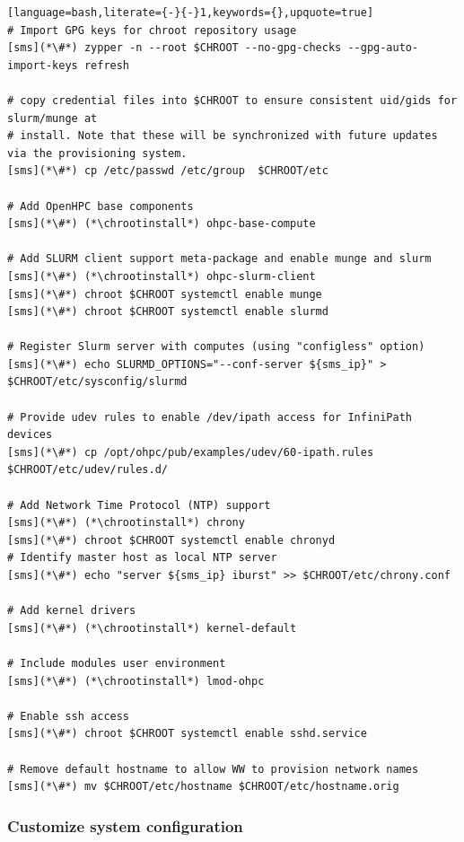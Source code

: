 \documentclass[letterpaper]{article}
\newcommand{\chrootinstall}{zypper -n --root \$CHROOT install}
\begin{document}
\begin{lstlisting}[language=bash,literate={-}{-}1,keywords={},upquote=true]
# Import GPG keys for chroot repository usage
[sms](*\#*) zypper -n --root $CHROOT --no-gpg-checks --gpg-auto-import-keys refresh

# copy credential files into $CHROOT to ensure consistent uid/gids for slurm/munge at
# install. Note that these will be synchronized with future updates via the provisioning system.
[sms](*\#*) cp /etc/passwd /etc/group  $CHROOT/etc

# Add OpenHPC base components
[sms](*\#*) (*\chrootinstall*) ohpc-base-compute

# Add SLURM client support meta-package and enable munge and slurm
[sms](*\#*) (*\chrootinstall*) ohpc-slurm-client
[sms](*\#*) chroot $CHROOT systemctl enable munge
[sms](*\#*) chroot $CHROOT systemctl enable slurmd

# Register Slurm server with computes (using "configless" option)
[sms](*\#*) echo SLURMD_OPTIONS="--conf-server ${sms_ip}" > $CHROOT/etc/sysconfig/slurmd

# Provide udev rules to enable /dev/ipath access for InfiniPath devices
[sms](*\#*) cp /opt/ohpc/pub/examples/udev/60-ipath.rules $CHROOT/etc/udev/rules.d/

# Add Network Time Protocol (NTP) support
[sms](*\#*) (*\chrootinstall*) chrony
[sms](*\#*) chroot $CHROOT systemctl enable chronyd
# Identify master host as local NTP server
[sms](*\#*) echo "server ${sms_ip} iburst" >> $CHROOT/etc/chrony.conf

# Add kernel drivers
[sms](*\#*) (*\chrootinstall*) kernel-default

# Include modules user environment
[sms](*\#*) (*\chrootinstall*) lmod-ohpc

# Enable ssh access 
[sms](*\#*) chroot $CHROOT systemctl enable sshd.service

# Remove default hostname to allow WW to provision network names
[sms](*\#*) mv $CHROOT/etc/hostname $CHROOT/etc/hostname.orig
\end{lstlisting}

\clearpage
\subsubsection{Customize system configuration} \label{sec:master_customization}



\end{document}
